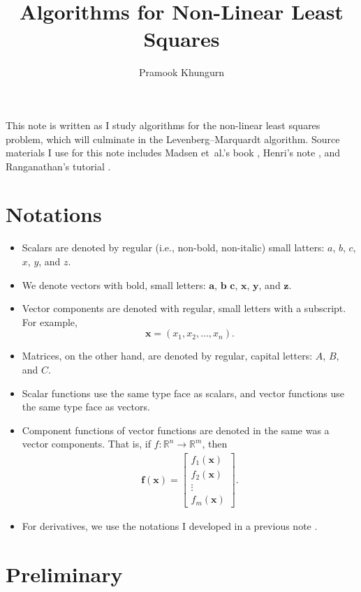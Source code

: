 \documentclass[10pt]{article}
\title{Algorithms for Non-Linear Least Squares}
\author{Pramook Khungurn}
\newcommand{\ve}[1]{\mathbf{#1}}
\newcommand{\etal}{{et~al.}}
\newcommand{\ra}{\rightarrow}
\newcommand{\Real}{\mathbb{R}}
\begin{document}
\maketitle

This note is written as I study algorithms for the non-linear least squares problem, which will culminate in the Levenberg--Marquardt algorithm. Source materials I use for this note includes Madsen \etal's book \cite{Madsen:2004}, Henri's note \cite{Henri:2024}, and Ranganathan's tutorial \cite{Ranganathan:2004}.

\section{Notations}

\begin{itemize}
    \item Scalars are denoted by regular (i.e., non-bold, non-italic) small latters: $a$, $b$, $c$, $x$, $y$, and $z$.
    \item We denote vectors with bold, small letters: $\ve{a}$, $\ve{b}$ $\ve{c}$, $\ve{x}$, $\ve{y}$, and $\ve{z}$.
    \item Vector components are denoted with regular, small letters with a subscript. For example, $$\ve{x} = (x_1, x_2, \dots, x_n).$$
    \item Matrices, on the other hand, are denoted by regular, capital letters: $A$, $B$, and $C$.
    \item Scalar functions use the same type face as scalars, and vector functions use the same type face as vectors.
    \item Component functions of vector functions are denoted in the same was a vector components. That is, if $f: \Real^n \ra \Real^m$, then
    \begin{align*}
        \ve{f}(\ve{x}) = \begin{bmatrix} f_1(\ve{x}) \\ f_2(\ve{x}) \\ \vdots \\ f_m(\ve{x}) \end{bmatrix}.
    \end{align*}
    \item For derivatives, we use the notations I developed in a previous note \cite{Khungurn:2022}.
\end{itemize}

\section{Preliminary}
\end{document}

